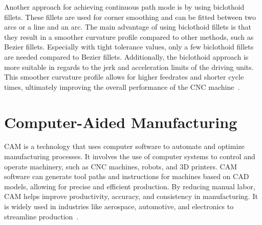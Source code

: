 

Another approach for achieving continuous path mode is by using biclothoid fillets. These fillets are used for corner smoothing and can be fitted between two arcs or a line and an arc. The main advantage of using biclothoid fillets is that they result in a smoother curvature profile compared to other methods, such as Bezier fillets. Especially with tight tolerance values, only a few biclothoid fillets are needed compared to Bezier fillets. Additionally, the biclothoid approach is more suitable in regards to the jerk and acceleration limits of the driving units. This smoother curvature profile allows for higher feedrates and shorter cycle times, ultimately improving the overall performance of the \acrshort{CNC} machine~\cite{Shahzadeh.2018}. 
\newpage















\section{Computer-Aided Manufacturing}\label{CAMmain}

\acrshort{CAM} is a technology that uses computer software to automate and optimize manufacturing processes. It involves the use of computer systems to control and operate machinery, such as \acrshort{CNC} machines, robots, and 3D printers. \acrshort{CAM} software can generate tool paths and instructions for machines based on \acrshort{CAD} models, allowing for precise and efficient production. By reducing manual labor, \acrshort{CAM} helps improve productivity, accuracy, and consistency in manufacturing. It is widely used in industries like aerospace, automotive, and electronics to streamline production~\cite{Bi.2021}.%


